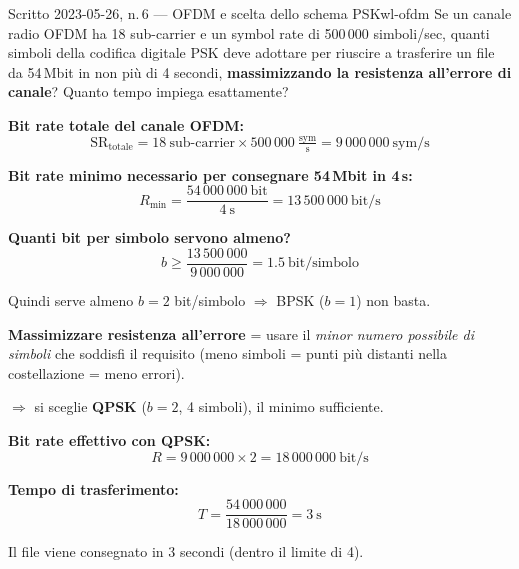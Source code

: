 \documentclass{report}
\begin{document}
\begin{Exercise}{Scritto 2023-05-26, n.\,6 --- OFDM e scelta dello schema PSK}{wl-ofdm}
Se un canale radio OFDM ha 18 sub-carrier e un symbol rate di 500\,000
simboli/sec, quanti simboli della codifica digitale PSK deve adottare per
riuscire a trasferire un file da 54\,Mbit in non più di 4 secondi,
\textbf{massimizzando la resistenza all'errore di canale}? Quanto tempo
impiega esattamente?
\end{Exercise}

\begin{solution}
\textbf{Bit rate totale del canale OFDM:}
\[
  \text{SR}_{\text{totale}} = 18\ \text{sub-carrier} \times 500\,000\ \tfrac{\text{sym}}{\text{s}}
  = 9\,000\,000\ \text{sym/s}
\]

\textbf{Bit rate minimo necessario per consegnare 54\,Mbit in 4\,s:}
\[
  R_{\min} = \frac{54\,000\,000\ \text{bit}}{4\ \text{s}} = 13\,500\,000\ \text{bit/s}
\]

\textbf{Quanti bit per simbolo servono almeno?}
\[
  b \geq \frac{13\,500\,000}{9\,000\,000} = 1.5\ \text{bit/simbolo}
\]

Quindi serve almeno $b=2$ bit/simbolo $\Rightarrow$ BPSK ($b=1$) non basta.

\textbf{Massimizzare resistenza all'errore} = usare il \emph{minor numero possibile
di simboli} che soddisfi il requisito (meno simboli = punti più distanti nella
costellazione = meno errori).

$\Rightarrow$ si sceglie \textbf{QPSK} ($b=2$, 4 simboli), il minimo sufficiente.

\medskip
\textbf{Bit rate effettivo con QPSK:}
\[
  R = 9\,000\,000 \times 2 = 18\,000\,000\ \text{bit/s}
\]

\textbf{Tempo di trasferimento:}
\[
  T = \frac{54\,000\,000}{18\,000\,000} = \boxed{3\ \text{s}}
\]

Il file viene consegnato in 3 secondi (dentro il limite di 4).
\end{solution}
\end{document}
